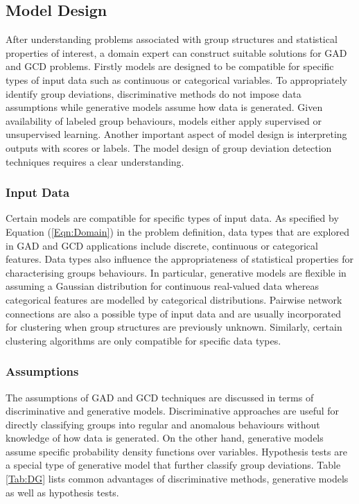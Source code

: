 \subsection{Model Design} 
After understanding problems associated with group structures and statistical properties of interest, a domain expert can construct suitable solutions for GAD and GCD problems. Firstly models are designed to be compatible for specific types of input data such as continuous or categorical variables. To appropriately identify group deviations, discriminative methods do not impose data assumptions  while generative models assume how data is generated.  Given availability of labeled group behaviours, models either apply  supervised or unsupervised learning. Another important aspect of model design is  interpreting outputs with scores or labels.  The model design of group deviation detection techniques requires a clear understanding. 

\subsubsection{Input Data }
Certain models are compatible for specific types of input data.   As specified by Equation (\ref{Eqn:Domain}) in the problem definition, data types that are explored in GAD and GCD applications include  discrete, continuous or categorical features.
Data types also influence the appropriateness of statistical properties for characterising  groups behaviours. In particular, generative models are flexible in assuming a Gaussian distribution for continuous real-valued data whereas categorical features are modelled by categorical distributions.   
 Pairwise network connections are also a possible type of input data and are usually  incorporated for clustering when group structures are previously unknown.  Similarly, certain clustering algorithms are only compatible for specific data types. 


 
\subsubsection{Assumptions}
 The assumptions of GAD and GCD techniques  are  discussed in terms of discriminative and generative models.  %
Discriminative approaches are useful for directly classifying groups into regular and anomalous behaviours without knowledge of how data is generated.  %
 On the other hand, generative models assume specific probability density functions over   variables.  Hypothesis tests are a special type of generative model that further classify group deviations. %
Table \ref{Tab:DG} lists common advantages of  discriminative methods, generative models as well as hypothesis tests. %

